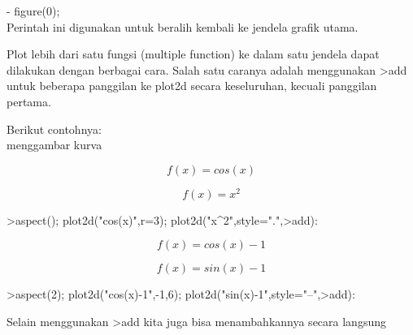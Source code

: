 \documentclass[a4paper,10pt]{article}
\begin{document}
\begin{eulernotebook}
\begin{eulercomment}
\begin{eulercomment}
\begin{eulercomment}
\begin{eulercomment}
\begin{eulercomment}
\begin{eulercomment}
\begin{eulercomment}
- figure(0);\\
Perintah ini digunakan untuk beralih kembali ke jendela grafik utama.
\end{eulercomment}
\begin{eulercomment}
Plot lebih dari satu fungsi (multiple function) ke dalam satu jendela
dapat dilakukan dengan berbagai cara. Salah satu caranya adalah
menggunakan \textgreater{}add untuk beberapa panggilan ke plot2d secara
keseluruhan, kecuali panggilan pertama.

Berikut contohnya:\\
menggambar kurva\\
\end{eulercomment}
\begin{eulerformula}
\[
 f(x)=cos(x)
\]
\end{eulerformula}
\begin{eulerformula}
\[
f(x)= x^2
\]
\end{eulerformula}
\begin{eulerprompt}
>aspect(); plot2d("cos(x)",r=3); plot2d("x^2",style=".",>add):
\end{eulerprompt}
\begin{eulerformula}
\[
f(x)=cos(x)-1
\]
\end{eulerformula}
\begin{eulerformula}
\[
f(x)= sin(x)-1
\]
\end{eulerformula}
\begin{eulerprompt}
>aspect(2); plot2d("cos(x)-1",-1,6); plot2d("sin(x)-1",style="--",>add):
\end{eulerprompt}
\begin{eulercomment}
Selain menggunakan \textgreater{}add kita juga bisa menambahkannya secara langsung


\end{eulercomment}
\end{eulercomment}
\end{eulercomment}
\end{eulercomment}
\end{eulercomment}
\end{eulercomment}
\end{eulercomment}
\end{eulernotebook}
\end{document}
